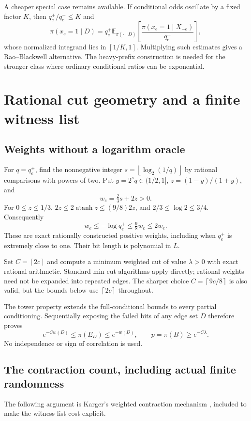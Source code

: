 \documentclass[11pt]{article}
\newcommand{\E}{\mathbb E}
\newcommand{\ceil}[1]{\left\lceil #1\right\rceil}
\newcommand{\floor}[1]{\left\lfloor #1\right\rfloor}
\begin{document}
A cheaper special case remains available. If conditional odds oscillate by a fixed factor $K$, then $q_e^+/q_e^-\le K$ and
\[
 \pi(x_e=1\mid D)=q_e^+\E_{\pi(\cdot\mid D)}
 \left[\frac{\pi(x_e=1\mid X_{-e})}{q_e^+}\right],
\]
whose normalized integrand lies in $[1/K,1]$. Multiplying such estimates gives a Rao--Blackwell alternative. The heavy-prefix construction is needed for the stronger class where ordinary conditional ratios can be exponential.

\section{Rational cut geometry and a finite witness list}
\label{sec:cuts}
\subsection{Weights without a logarithm oracle}
For $q=q_e^+$, find the nonnegative integer $s=\floor{\log_2(1/q)}$ by rational comparisons with powers of two. Put $y=2^sq\in(1/2,1]$, $z=(1-y)/(1+y)$, and
\begin{equation}
 w_e=\tfrac23s+2z>0.
 \label{eq:rationalweights}
\end{equation}
For $0\le z\le1/3$, $2z\le2\operatorname{atanh}z\le(9/8)2z$, and $2/3\le\log2\le3/4$. Consequently
\begin{equation}
 w_e\le-\log q_e^+\le\tfrac98w_e\le2w_e.
 \label{eq:logbounds}
\end{equation}
These are exact rationally constructed positive weights, including when $q_e^+$ is extremely close to one. Their bit length is polynomial in $L$.

Set $C=\ceil{2c}$ and compute a minimum weighted cut of value $\lambda>0$ with exact rational arithmetic. Standard min-cut algorithms apply directly; rational weights need not be expanded into repeated edges. The sharper choice $C=\ceil{9c/8}$ is also valid, but the bounds below use $\ceil{2c}$ throughout.

The tower property extends the full-conditional bounds to every partial conditioning. Sequentially exposing the failed bits of any edge set $D$ therefore proves
\begin{equation}
 e^{-Cw(D)}\le\pi(E_D)\le e^{-w(D)},\qquad
 p=\pi(B)\ge e^{-C\lambda}.
 \label{eq:witness}
\end{equation}
No independence or sign of correlation is used.

\subsection{The contraction count, including actual finite randomness}
The following argument is Karger's weighted contraction mechanism \cite{karger}, included to make the witness-list cost explicit.
\end{document}

